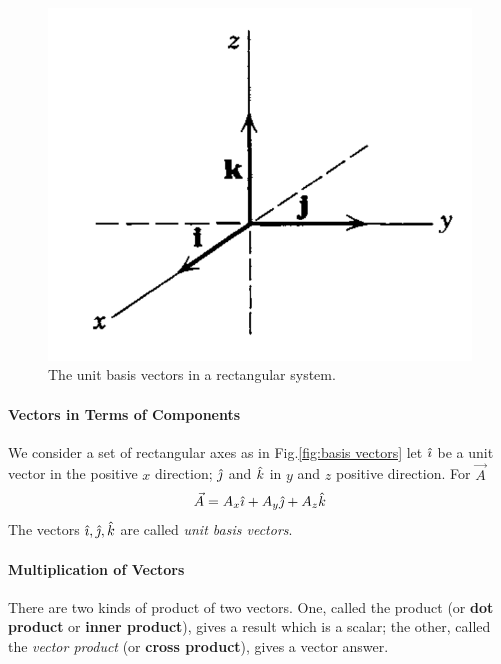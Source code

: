             \begin{figure}
                \includegraphics[width=0.9\linewidth]{figures/basis vectors.png}
                \caption{The unit basis vectors in a rectangular system.}
                \label{fig:basis vectors}
            \end{figure}

            \paragraph{Vectors in Terms of Components} We consider a set of rectangular axes as in Fig.\eqref{fig:basis vectors}
            let $\hat{\imath} $ be a unit vector in the positive $x$ direction; $\hat{\jmath} $ and $\hat{k} $
            in $y$ and $z$ positive direction. For $\vec{A}$
            \begin{align}
                \vec{A} = A_x\hat{\imath}  + A_y\hat{\jmath}  + A_z\hat{k} 
            \end{align} 
            The vectors $\hat{\imath} , \hat{\jmath} , \hat{k} $ are called \textit{unit basis vectors}.

            \paragraph{Multiplication of Vectors} There are two kinds of product of two vectors. 
            One, called the  product (or \textbf{dot product} or \textbf{inner product}), 
            gives a result which is a scalar; the other, called the \textit{vector product} 
            (or \textbf{cross product}), gives a vector answer.

